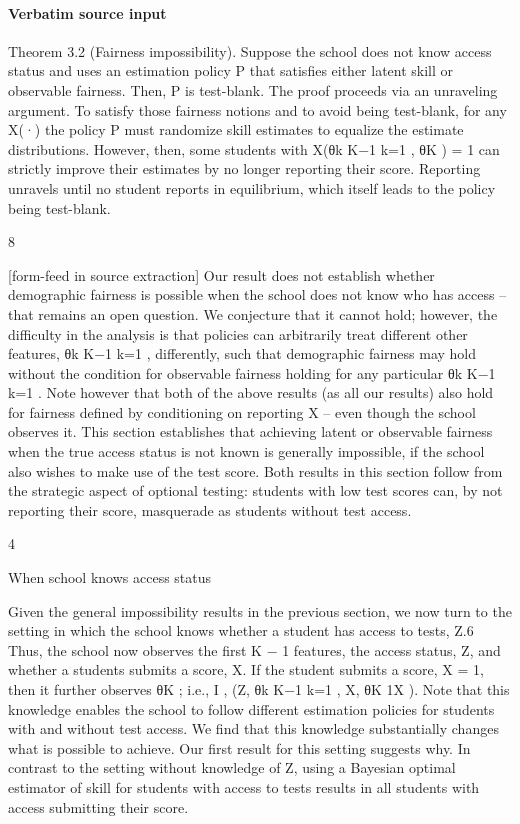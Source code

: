 \documentclass[10pt]{article}
\begin{document}
\paragraph{Verbatim source input}
\begin{ReviewVerbatim}
Theorem 3.2 (Fairness impossibility). Suppose the school does not know access status and uses an
estimation policy P that satisfies either latent skill or observable fairness. Then, P is test-blank.
The proof proceeds via an unraveling argument. To satisfy those fairness notions and to avoid
being test-blank, for any X(·) the policy P must randomize skill estimates to equalize the estimate distributions. However, then, some students with X({θk }K−1
k=1 , θK ) = 1 can strictly improve
their estimates by no longer reporting their score. Reporting unravels until no student reports in
equilibrium, which itself leads to the policy being test-blank.

8


[form-feed in source extraction]
Our result does not establish whether demographic fairness is possible when the school does not
know who has access – that remains an open question. We conjecture that it cannot hold; however,
the diﬃculty in the analysis is that policies can arbitrarily treat diﬀerent other features, {θk }K−1
k=1 ,
diﬀerently, such that demographic fairness may hold without the condition for observable fairness
holding for any particular {θk }K−1
k=1 . Note however that both of the above results (as all our results)
also hold for fairness deﬁned by conditioning on reporting X – even though the school observes it.
This section establishes that achieving latent or observable fairness when the true access status
is not known is generally impossible, if the school also wishes to make use of the test score. Both
results in this section follow from the strategic aspect of optional testing: students with low test
scores can, by not reporting their score, masquerade as students without test access.

4

When school knows access status

Given the general impossibility results in the previous section, we now turn to the setting in which
the school knows whether a student has access to tests, Z.6 Thus, the school now observes the ﬁrst
K − 1 features, the access status, Z, and whether a students submits a score, X. If the student
submits a score, X = 1, then it further observes θK ; i.e., I , (Z, {θk }K−1
k=1 , X, θK 1X ). Note that this
knowledge enables the school to follow diﬀerent estimation policies for students with and without
test access. We ﬁnd that this knowledge substantially changes what is possible to achieve.
Our ﬁrst result for this setting suggests why. In contrast to the setting without knowledge of Z,
using a Bayesian optimal estimator of skill for students with access to tests results in all students
with access submitting their score.
\end{ReviewVerbatim}
\end{document}
